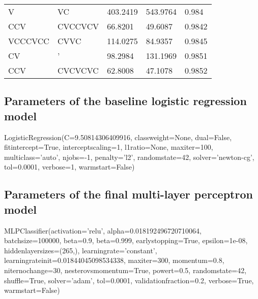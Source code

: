 \begin{table}[H]
\begin{tabular}{@{}lllll@{}}
		V       & VC      & 403.2419      & 543.9764        & 0.984   \\
		CCV     & CVCCVCV & 66.8201       & 49.6087         & 0.9842  \\
		VCCCVCC & CVVC    & 114.0275      & 84.9357         & 0.9845  \\
		CV      & '       & 98.2984       & 131.1969        & 0.9851  \\
		CCV     & CVCVCVC & 62.8008       & 47.1078         & 0.9852  \\ \bottomrule
	\end{tabular}
\end{table}

\subsection*{Parameters of the baseline logistic regression model}
LogisticRegression(C=9.50814306409916, class\textunderscore weight=None, dual=False,
fit\textunderscore intercept=True, intercept\textunderscore scaling=1, l1\textunderscore ratio=None,
max\textunderscore iter=100, multi\textunderscore class='auto', n\textunderscore jobs=-1, penalty='l2',
random\textunderscore state=42, solver='newton-cg', tol=0.0001, verbose=1,
warm\textunderscore start=False)

\subsection*{Parameters of the final multi-layer perceptron model}
MLPClassifier(activation='relu', alpha=0.018192496720710064, batch\textunderscore size=100000,
beta=0.9, beta=0.999, early\textunderscore stopping=True, epsilon=1e-08,
hidden\textunderscore layer\textunderscore sizes=(265,), learning\textunderscore rate='constant',
learning\textunderscore rate\textunderscore init=0.01844045098534338, max\textunderscore iter=300,
momentum=0.8, n\textunderscore iter\textunderscore no\textunderscore change=30, nesterovs\textunderscore momentum=True,
power\textunderscore t=0.5, random\textunderscore state=42, shuffle=True, solver='adam',
tol=0.0001, validation\textunderscore fraction=0.2, verbose=True,
warm\textunderscore start=False)